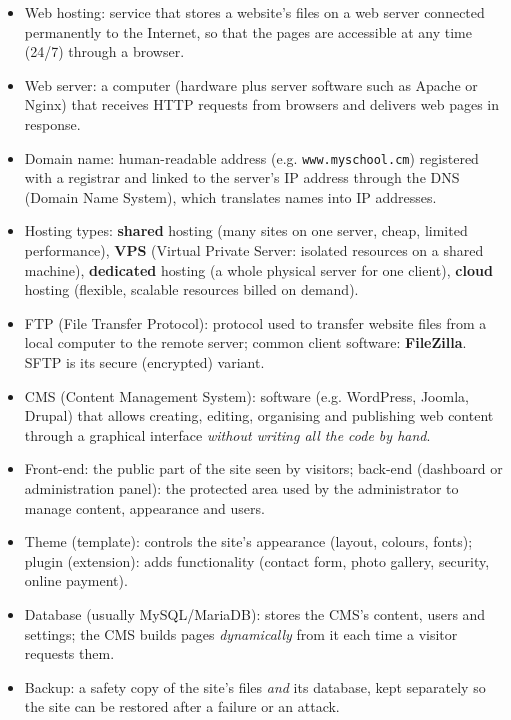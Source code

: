 \documentclass[11pt]{article}
\newcommand{\cle}[1]{{\popxbold\color{popdark}#1}}
\begin{document}
\begin{aretenir}
\begin{itemize}
\item \cle{Web hosting}: service that stores a website's files on a \cle{web server} connected permanently to the Internet, so that the pages are accessible at any time (24/7) through a browser.
\item \cle{Web server}: a computer (hardware plus server software such as Apache or Nginx) that receives HTTP requests from browsers and delivers web pages in response.
\item \cle{Domain name}: human-readable address (e.g. \texttt{www.myschool.cm}) registered with a \cle{registrar} and linked to the server's IP address through the \cle{DNS} (Domain Name System), which translates names into IP addresses.
\item \cle{Hosting types}: \textbf{shared} hosting (many sites on one server, cheap, limited performance), \textbf{VPS} (Virtual Private Server: isolated resources on a shared machine), \textbf{dedicated} hosting (a whole physical server for one client), \textbf{cloud} hosting (flexible, scalable resources billed on demand).
\item \cle{FTP} (File Transfer Protocol): protocol used to transfer website files from a local computer to the remote server; common client software: \textbf{FileZilla}. \cle{SFTP} is its secure (encrypted) variant.
\item \cle{CMS} (Content Management System): software (e.g. WordPress, Joomla, Drupal) that allows creating, editing, organising and publishing web content through a graphical interface \emph{without writing all the code by hand}.
\item \cle{Front-end}: the public part of the site seen by visitors; \cle{back-end} (dashboard or administration panel): the protected area used by the administrator to manage content, appearance and users.
\item \cle{Theme} (template): controls the site's appearance (layout, colours, fonts); \cle{plugin} (extension): adds functionality (contact form, photo gallery, security, online payment).
\item \cle{Database} (usually MySQL/MariaDB): stores the CMS's content, users and settings; the CMS builds pages \emph{dynamically} from it each time a visitor requests them.
\item \cle{Backup}: a safety copy of the site's files \emph{and} its database, kept separately so the site can be restored after a failure or an attack.
\end{itemize}
\end{aretenir}
\end{document}
